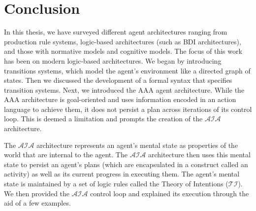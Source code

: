 \chapter{Conclusion}

%
%
%
%

In this thesis, we have surveyed different agent architectures ranging from production rule systems, logic-based architectures (such as BDI architectures), and those with normative models and cognitive models.
The focus of this work has been on modern logic-based architectures.
We began by introducing transitions systems, which model the agent's environment like a directed graph of states.
Then we discussed the development of a formal syntax that specifies transition systems.
Next, we introduced the AAA agent architecture.
While the AAA architecture is goal-oriented and uses information encoded in an action language to achieve them, it does not persist a plan across iterations of its control loop.
This is deemed a limitation and prompts the creation of the $\mathcal{AIA}$ architecture.

The $\mathcal{AIA}$ architecture represents an agent's mental state as properties of the world that are internal to the agent.
The $\mathcal{AIA}$ architecture then uses this mental state to persist an agent's plans (which are encapsulated in a construct called an activity) as well as its current progress in executing them.
The agent's mental state is maintained by a set of logic rules called the Theory of Intentions ($\mathcal{TI}$).
We then provided the $\mathcal{AIA}$ control loop and explained its execution through the aid of a few examples.


